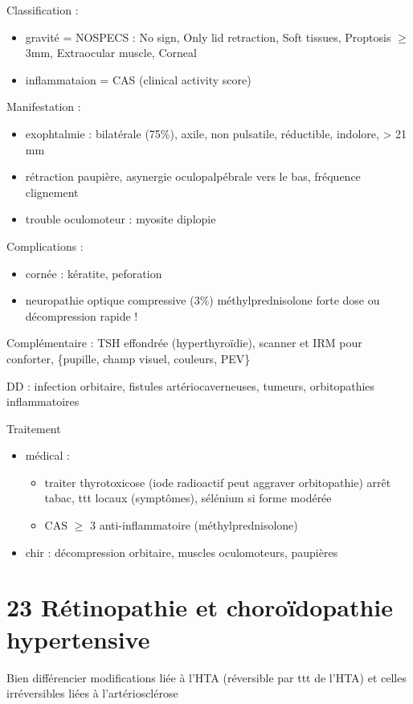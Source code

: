 \documentclass[11pt]{article}
\begin{document}
Classification :
\begin{itemize}
\item gravité = NOSPECS : No sign, Only lid retraction, Soft tissues, Proptosis \(\ge\)
3mm, Extraocular muscle, Corneal
\item inflammataion = CAS
(clinical activity score)
\end{itemize}

Manifestation :
\begin{itemize}
\item exophtalmie : bilatérale (75\%), axile, non pulsatile, réductible, indolore,
> 21 mm
\item rétraction paupière, asynergie oculopalpébrale vers le bas, \dec fréquence
clignement
\item trouble oculomoteur : myosite \thus diplopie
\end{itemize}

Complications :
\begin{itemize}
\item cornée : kératite, peforation
\item neuropathie optique compressive (3\%) \thus méthylprednisolone forte dose ou
décompression rapide \skull !
\end{itemize}

Complémentaire : TSH effondrée (hyperthyroïdie), scanner et IRM pour conforter,
\{pupille, champ visuel, couleurs, PEV\}

DD : infection orbitaire, fistules artériocaverneuses, tumeurs, orbitopathies
inflammatoires

Traitement 
\begin{itemize}
\item médical : 
\begin{itemize}
\item traiter thyrotoxicose (\danger iode radioactif peut aggraver orbitopathie) arrêt tabac, ttt locaux (symptômes), sélénium si forme modérée
\item CAS \(\ge\) 3 \thus anti-inflammatoire (méthylprednisolone)
\end{itemize}
\item chir : décompression orbitaire, muscles oculomoteurs, paupières
\end{itemize}
\section{23 Rétinopathie et choroïdopathie hypertensive}
\label{sec:org1e5bf95}
Bien différencier modifications liée à l'HTA (réversible par ttt de l'HTA) et
celles irréversibles liées à l'artériosclérose 
\end{document}
